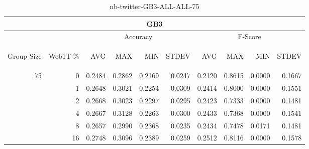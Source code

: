 \begin{center}
\begin{table}[htbp]
\begin{tabular}{ | r | r | r | r | r | r | r | r | r | r |}
\hline
\multicolumn{10}{|c|}{GB3}\\
\hline
 & & \multicolumn{4}{|c|}{Accuracy} & \multicolumn{4}{|c|}{F-Score}\\ \cline{3-10}
\begin{sideways}Group Size\end{sideways} & \begin{sideways}Web1T \%\end{sideways} & \begin{sideways}AVG\end{sideways} & \begin{sideways}MAX\end{sideways} & \begin{sideways}MIN\end{sideways} & \begin{sideways}STDEV\end{sideways} & \begin{sideways}AVG\end{sideways} & \begin{sideways}MAX\end{sideways} & \begin{sideways}MIN\end{sideways} & \begin{sideways}STDEV\end{sideways}\\
\hline
\multirow{5}{*}{75}
 & 0 & 0.2484 & 0.2862 & 0.2169 & 0.0247 & 0.2120 & 0.8615 & 0.0000 & 0.1667\\ \cline{2-10}
 & 1 & 0.2648 & 0.3021 & 0.2254 & 0.0309 & 0.2414 & 0.8000 & 0.0000 & 0.1551\\ \cline{2-10}
 & 2 & 0.2668 & 0.3023 & 0.2297 & 0.0295 & 0.2423 & 0.7333 & 0.0000 & 0.1481\\ \cline{2-10}
 & 4 & 0.2667 & 0.3128 & 0.2263 & 0.0300 & 0.2433 & 0.7368 & 0.0000 & 0.1541\\ \cline{2-10}
 & 8 & 0.2657 & 0.2990 & 0.2368 & 0.0235 & 0.2434 & 0.7478 & 0.0171 & 0.1481\\ \cline{2-10}
 & 16 & 0.2748 & 0.3096 & 0.2389 & 0.0259 & 0.2512 & 0.8116 & 0.0000 & 0.1578\\ \cline{2-10}
\hline
\end{tabular}
\caption{nb-twitter-GB3-ALL-ALL-75}
\label{table:nb-twitter-GB3-ALL-ALL-75}
\end{table}
\end{center}

